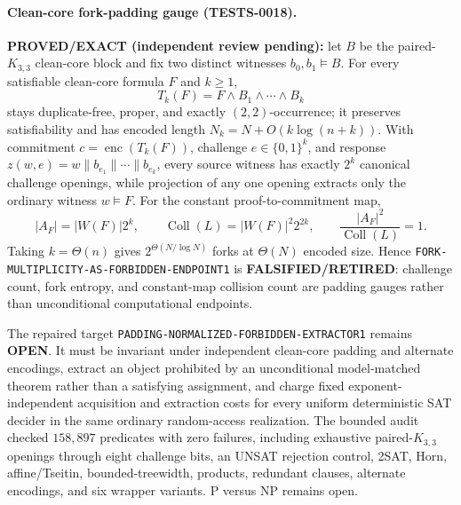 \documentclass[11pt]{article}
\begin{document}
\paragraph{Clean-core fork-padding gauge (TESTS-0018).}
\textbf{PROVED/EXACT (independent review pending):} let \(B\) be the
paired-\(K_{3,3}\) clean-core block and fix two distinct witnesses
\(b_0,b_1\models B\).  For every satisfiable clean-core formula \(F\) and
\(k\geq 1\),
\[
 T_k(F)=F\wedge B_1\wedge\cdots\wedge B_k
\]
stays duplicate-free, proper, and exactly \((2,2)\)-occurrence; it preserves
satisfiability and has encoded length
\(N_k=N+O(k\log(n+k))\).  With commitment
\(c=\operatorname{enc}(T_k(F))\), challenge \(e\in\{0,1\}^k\), and response
\(z(w,e)=w\|b_{e_1}\|\cdots\|b_{e_k}\), every source witness has exactly
\(2^k\) canonical challenge openings, while projection of any one opening
extracts only the ordinary witness \(w\models F\).  For the constant
proof-to-commitment map,
\[
 |A_F|=|W(F)|2^k,\qquad
 \operatorname{Coll}(L)=|W(F)|^2 2^{2k},\qquad
 \frac{|A_F|^2}{\operatorname{Coll}(L)}=1.
\]
Taking \(k=\Theta(n)\) gives \(2^{\Theta(N/\log N)}\) forks at
\(\Theta(N)\) encoded size.  Hence
\texttt{FORK-MULTIPLICITY-AS-FORBIDDEN-ENDPOINT1} is
\textbf{FALSIFIED/RETIRED}: challenge count, fork entropy, and constant-map
collision count are padding gauges rather than unconditional computational
endpoints.

The repaired target
\texttt{PADDING-NORMALIZED-FORBIDDEN-EXTRACTOR1} remains \textbf{OPEN}.  It
must be invariant under independent clean-core padding and alternate
encodings, extract an object prohibited by an unconditional model-matched
theorem rather than a satisfying assignment, and charge fixed
exponent-independent acquisition and extraction costs for every uniform
deterministic SAT decider in the same ordinary random-access realization.
The bounded audit checked \(158{,}897\) predicates with zero failures,
including exhaustive paired-\(K_{3,3}\) openings through eight challenge
bits, an UNSAT rejection control, 2SAT, Horn, affine/Tseitin,
bounded-treewidth, products, redundant clauses, alternate encodings, and six
wrapper variants.  P versus NP remains open.
\end{document}
